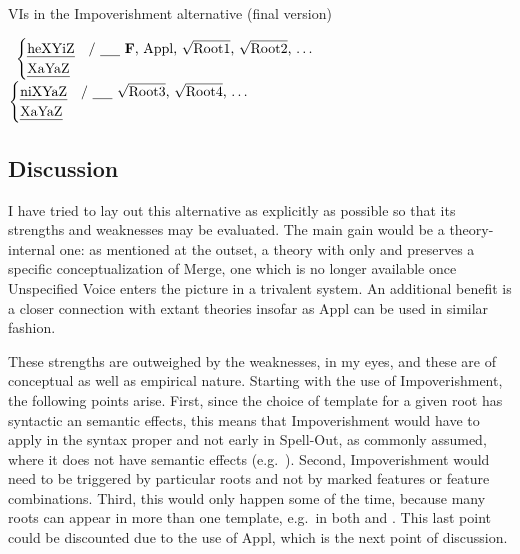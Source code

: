 \begin{exe}
\begin{xlist}
\begin{exe}
\begin{exe}
\begin{xlist}
\begin{exe}
\begin{exe}
\begin{exe}
\begin{exe}
\begin{exe}
\begin{xlist}
\begin{exe}
\begin{exe}
\begin{xlist}
\begin{exe}
\begin{xlist}
\begin{exe}
\begin{xlist}
 \begin{exe}
 \ex  \label{aas:ex:jim-vis}VIs in the Impoverishment alternative (final version) 
 \begin{xlist} 
 	\ex  {\vds} \lra~$\begin{cases} 
		\text{\thif} & \text{/ \trace~\textbf{F}, Appl, \root{Root1}, \root{Root2}, \dots}\\
		\text{\tkal} & \\
		\end{cases}$
 	\ex  {\vzs} \lra~$\begin{cases} 
		\text{\tnif} & \text{/ \trace~\root{Root3}, \root{Root4}, \dots}\\
		\text{\tkal} & \\
		\end{cases}$
 \z
\z 

	
	\subsection{Discussion} \label{aas:jim:cons}
I have tried to lay out this alternative as explicitly as possible so that its strengths and weaknesses may be evaluated. The main gain would be a theory-internal one: as mentioned at the outset, a theory with only {\vds} and {\vzs} preserves a specific conceptualization of Merge, one which is no longer available once Unspecified Voice enters the picture in a trivalent system. An additional benefit is a closer connection with extant theories insofar as Appl can be used in similar fashion.

These strengths are outweighed by the weaknesses, in my eyes, and these are of conceptual as well as empirical nature. Starting with the use of Impoverishment, the following points arise. First, since the choice of template for a given root has syntactic an semantic effects, this means that Impoverishment would have to apply in the syntax proper and not early in Spell-Out, as commonly assumed, where it does not have semantic effects (e.g.~\citealt{harbour03}). Second, Impoverishment would need to be triggered by particular roots and not by marked features or feature combinations. Third, this would only happen some of the time, because many roots can appear in more than one template, e.g.~in both {\thif} and {\tkal}. This last point could be discounted due to the use of Appl, which is the next point of discussion.


\end{xlist}
\end{exe}
\end{xlist}
\end{exe}
\end{xlist}
\end{exe}
\end{xlist}
\end{exe}
\end{exe}
\end{xlist}
\end{exe}
\end{exe}
\end{exe}
\end{exe}
\end{exe}
\end{xlist}
\end{exe}
\end{exe}
\end{xlist}
\end{exe}
